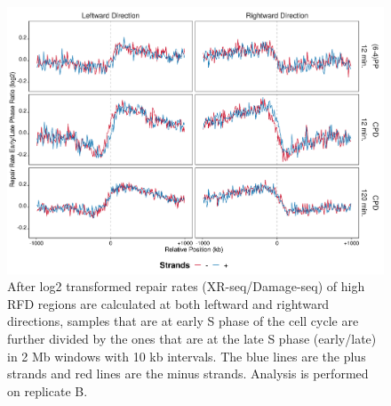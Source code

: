 \begin{figure}[H]
\begin{center}
\includegraphics[width=\textwidth]{Chapters/7_appendix/figures/supfig73}
\caption[Repair rate early/late ratio of high RFDs in 2 Mb (replicate B).]{After log2 transformed repair rates (XR-seq/Damage-seq) of high RFD regions are calculated at both leftward and rightward directions, samples that are at early S phase of the cell cycle are further divided by the ones that are at the late S phase (early/late) in 2 Mb windows with 10 kb intervals. The blue lines are the plus strands and red lines are the minus strands. Analysis is performed on replicate B.}
\label{supfig:rrel2000rfdB}
\end{center}
\end{figure}

